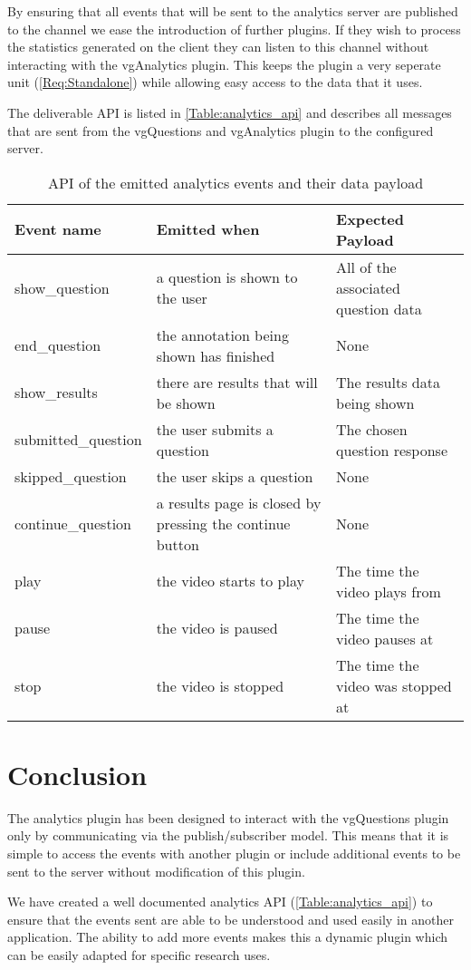 By ensuring that all events that will be sent to the analytics server are published to the  channel we ease the introduction of further plugins. If they wish to process the statistics generated on the client they  can listen to this channel without interacting with the vgAnalytics plugin. This keeps the plugin a very seperate unit (\cref{Req:Standalone}) while allowing easy access to the data that it uses.

The deliverable API is listed in \autoref{Table:analytics_api} and describes all messages that are sent from the vgQuestions and vgAnalytics plugin to the configured server.

\begin{table}[h]
\begin{tabular}{p{3.2cm} p{6cm} p{4cm}}
\caption{\label{Table:analytics_api}API of the emitted analytics events and their data payload}
\textbf{Event name} & \textbf{Emitted when} & \textbf{Expected Payload} \\
\hline
show\_question & a question is shown to the user & All of the associated question data \\
\hline
end\_question & the annotation being shown has finished & None \\
\hline
show\_results & there are results that will be shown & The results data being shown \\
\hline
submitted\_question & the user submits a question & The chosen question response \\
\hline
skipped\_question & the user skips a question & None \\
\hline
continue\_question & a results page is closed by pressing the continue button & None \\
\hline
play & the video starts to play & The time the video plays from \\
\hline
pause & the video is paused & The time the video pauses at \\
\hline
stop & the video is stopped & The time the video was stopped at \\
\end{tabular}
\end{table}

\section{Conclusion}

The analytics plugin has been designed to interact with the \gls{vgQuestions} plugin only by communicating via the publish/subscriber model. This means that it is simple to access the events with another plugin or include additional events to be sent to the server without modification of this plugin.

We have created a well documented analytics \gls{API} (\autoref{Table:analytics_api}) to ensure that the events sent are able to be understood and used easily in another application. The ability to add more events makes this a dynamic plugin which can be easily adapted for specific research uses.